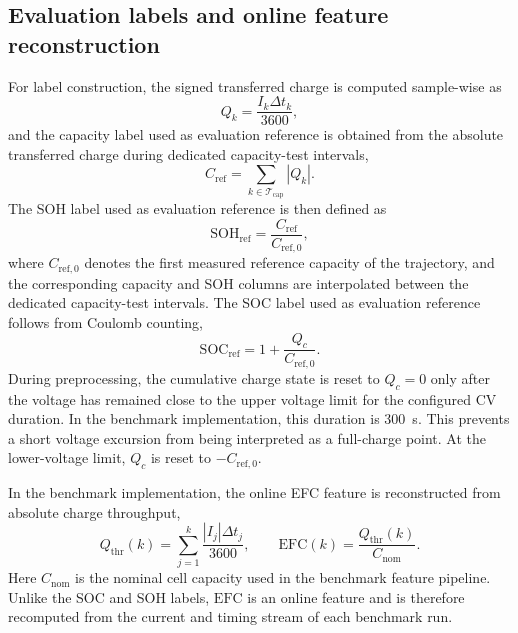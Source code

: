 \documentclass[
    a4paper,
    12pt,
    titlepage,
    bibliography=totoc,
    twoside=on,
    parskip=false,
    numbers=noenddot,
    cleardoublepage=empty,
    DIV=12,
    BCOR=12.0mm,
    headheight=36pt,
    headings=openright
]{scrreprt}
\begin{document}
\subsection{Evaluation labels and online feature reconstruction}
For label construction, the signed transferred charge is computed sample-wise as
\begin{equation}
    Q_k=\frac{I_k\Delta t_k}{3600},
    \label{eq:robustness_reference_charge_increment}
\end{equation}
and the capacity label used as evaluation reference is obtained from the absolute transferred charge during dedicated capacity-test intervals,
\begin{equation}
    C_{\mathrm{ref}}=\sum_{k\in\mathcal{T}_{\mathrm{cap}}}\left|Q_k\right|.
    \label{eq:robustness_reference_capacity}
\end{equation}
The SOH label used as evaluation reference is then defined as
\begin{equation}
    \mathrm{SOH}_{\mathrm{ref}}=\frac{C_{\mathrm{ref}}}{C_{\mathrm{ref},0}},
    \label{eq:robustness_reference_soh}
\end{equation}
where $C_{\mathrm{ref},0}$ denotes the first measured reference capacity of the trajectory, and the corresponding capacity and SOH columns are interpolated between the dedicated capacity-test intervals. The SOC label used as evaluation reference follows from Coulomb counting,
\begin{equation}
    \mathrm{SOC}_{\mathrm{ref}}=1+\frac{Q_c}{C_{\mathrm{ref},0}}.
    \label{eq:robustness_reference_soc}
\end{equation}
During preprocessing, the cumulative charge state is reset to $Q_c=0$ only after the voltage has remained close to the upper voltage limit for the configured CV duration. In the benchmark implementation, this duration is \SI{300}{\second}. This prevents a short voltage excursion from being interpreted as a full-charge point. At the lower-voltage limit, $Q_c$ is reset to $-C_{\mathrm{ref},0}$.

In the benchmark implementation, the online EFC feature is reconstructed from absolute charge throughput,
\begin{equation}
    Q_{\mathrm{thr}}(k)=\sum_{j=1}^{k}\frac{|I_j|\Delta t_j}{3600},
    \qquad
    \mathrm{EFC}(k)=\frac{Q_{\mathrm{thr}}(k)}{C_{\mathrm{nom}}}.
    \label{eq:robustness_efc}
\end{equation}
Here $C_{\mathrm{nom}}$ is the nominal cell capacity used in the benchmark feature pipeline. Unlike the SOC and SOH labels, $\mathrm{EFC}$ is an online feature and is therefore recomputed from the current and timing stream of each benchmark run.
\end{document}
